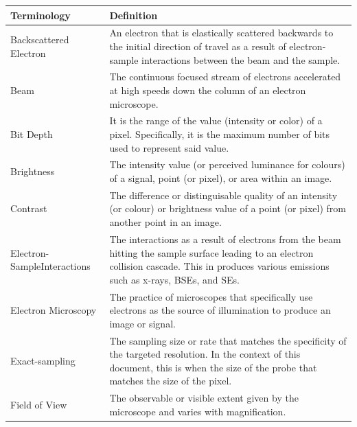 \documentclass[12pt]{article}
\begin{document}
\begin{center}
    \noindent
    \begin{longtable}{p{4.25cm} p{11.25cm}} 
        \toprule
        \textbf{Terminology} & \textbf{Definition}\\
        \midrule
        Backscattered Electron & An electron that is elastically scattered backwards to the initial direction of travel as a result of electron-sample interactions between the beam and the sample. \\
        
        Beam & The continuous focused stream of electrons accelerated at high speeds down the column of an electron microscope. \\

        Bit Depth & It is the range of the value (intensity or color) of a pixel. Specifically, it is the maximum number of bits used to represent said value. \\
        
        Brightness & The intensity value (or perceived luminance for colours) of a signal, point (or pixel), or area within an image. \\
        
        Contrast & The difference or distinguisable quality of an intensity (or colour) or brightness value of a point (or pixel) from another point in an image.\\
        
        Electron-Sample\newline Interactions & The interactions as a result of electrons from the beam hitting the sample surface leading to an electron collision cascade. This in produces various emissions such as x-rays, BSEs, and SEs. \\
        
        Electron Microscopy & The practice of microscopes that specifically use electrons as the source of illumination to produce an image or signal.  \\
        
        Exact-sampling & The sampling size or rate that matches the specificity of the targeted resolution. In the context of this document, this is when the size of the probe that matches the size of the pixel. \\
        
        Field of View & The observable or visible extent given by the microscope and varies with magnification. \\
        

\end{longtable}
\end{center}
\end{document}
